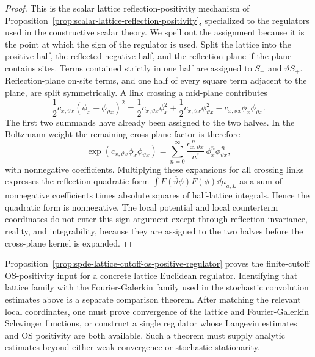 \begin{proof}
This is the scalar lattice reflection-positivity mechanism of
Proposition~\ref{prop:scalar-lattice-reflection-positivity}, specialized to
the regulators used in the constructive scalar theory.  We spell out the
assignment because it is the point at which the sign of the regulator is
used.  Split the lattice into the positive half, the reflected negative half,
and the reflection plane if the plane contains sites.  Terms contained
strictly in one half are assigned to \(S_+\) and \(\vartheta S_+\).
Reflection-plane on-site terms, and one half of every square term adjacent to
the plane, are split symmetrically.  A link crossing a mid-plane contributes
\[
  \frac12 c_{x,\vartheta x}(\phi_x-\phi_{\vartheta x})^2
  =
  \frac12 c_{x,\vartheta x}\phi_x^2
  +\frac12 c_{x,\vartheta x}\phi_{\vartheta x}^2
  -c_{x,\vartheta x}\phi_x\phi_{\vartheta x}.
\]
The first two summands have already been assigned to the two halves.  In
the Boltzmann weight the remaining cross-plane factor is therefore
\[
  \exp(c_{x,\vartheta x}\phi_x\phi_{\vartheta x})
  =
  \sum_{n=0}^{\infty}
  \frac{c_{x,\vartheta x}^{\,n}}{n!}\,
  \phi_x^n\phi_{\vartheta x}^{\,n},
\]
with nonnegative coefficients.  Multiplying these expansions for all
crossing links expresses the reflection quadratic form
\(\int\overline{F(\vartheta\phi)}F(\phi)\dd\mu_{a,L}\) as a sum of
nonnegative coefficients times absolute squares of half-lattice integrals.
Hence the quadratic form is nonnegative.  The local potential and local
counterterm coordinates do not enter this sign argument except through
reflection invariance, reality, and integrability, because they are assigned
to the two halves before the cross-plane kernel is expanded.
\end{proof}

Proposition~\ref{prop:spde-lattice-cutoff-os-positive-regulator} proves the
finite-cutoff OS-positivity input for a concrete lattice Euclidean regulator.
Identifying that lattice family with the Fourier-Galerkin family used in the
stochastic convolution estimates above is a separate comparison theorem.
After matching the relevant local coordinates, one must prove convergence of
the lattice and Fourier-Galerkin Schwinger functions, or construct a single
regulator whose Langevin estimates and OS positivity are both available.  Such
a theorem must supply analytic estimates beyond either weak convergence or
stochastic stationarity.

